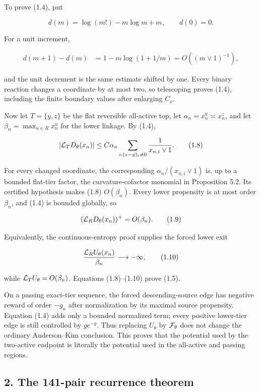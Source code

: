 To prove (1.4), put

\[
 d(m)=\log(m!)-m\log m+m,\qquad d(0)=0.
\tag{1.6}
\]

For a unit increment,

\[
\begin{split}
 d(m+1)-d(m)
 &=1-m\log(1+1/m)=O((m\vee1)^{-1}),
\end{split}
\tag{1.7}
\]

and the unit decrement is the same estimate shifted by one. Every binary
reaction changes a coordinate by at most two, so telescoping proves
(1.4), including the finite boundary values after enlarging \(C_\nu\).

Now let \(T=\{y,z\}\) be the flat reversible all-active top, let
\(\alpha_n=x_n^y\asymp x_n^z\), and let \(\beta_n=\max_{u\in R}x_n^u\)
for the lower linkage. By (1.4),

\[
 |{\cal L}_TD_\theta(x_n)|
 \le C\alpha_n\sum_{i:(z-y)_i\ne0}{1\over x_{n,i}\vee1}.
\tag{1.8}
\]

For every changed coordinate, the corresponding
\(\alpha_n/(x_{n,i}\vee1)\) is, up to a bounded flat-tier factor, the
curvature-cofactor monomial in Proposition 5.2. Its certified hypothesis
makes (1.8) \(O(\beta_n)\). Every lower propensity is at most order
\(\beta_n\), and (1.4) is bounded globally, so

\[
 ({\cal L}_RD_\theta(x_n))^+=O(\beta_n).
\tag{1.9}
\]

Equivalently, the continuous-entropy proof supplies the forced lower
exit

\[
 {{\cal L}_RU_\theta(x_n)\over\beta_n}
 \longrightarrow-\infty,
\tag{1.10}
\]

while \({\cal L}_TU_\theta=O(\beta_n)\). Equations (1.8)--(1.10) prove
(1.5).

On a passing exact-tier sequence, the forced descending-source edge has
negative reward of order \(-g_n\) after normalization by its maximal
source propensity. Equation (1.4) adds only a bounded normalized term;
every positive lower-tier edge is still controlled by \(g e^{-g}\). Thus
replacing \(U_\theta\) by \({\cal F}_\theta\) does not change the
ordinary Anderson--Kim conclusion. This proves that the potential used
by the two-active endpoint is literally the potential used in the
all-active and passing regions.

\subsection{2. The 141-pair recurrence
theorem}

